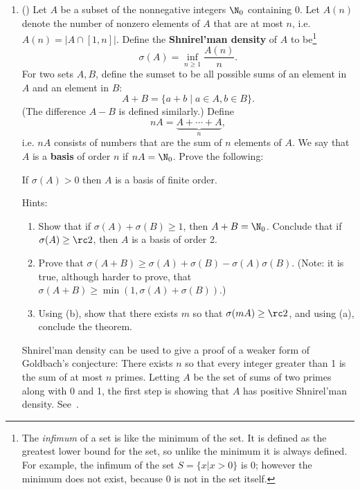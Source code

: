 \begin{enumerate}
\item (\cite[\S 7.4]{Nat}) Let $A$ be a subset of the nonnegative integers $\N_0$ containing 0. Let $A(n)$ denote the number of nonzero elements of $A$ that are at most $n$, i.e. $A(n)=|A\cap [1,n]|$. Define the \textbf{Shnirel'man density} of $A$ to be{\footnote{The {\it infimum} of a set is like the minimum of the set. It is defined as the greatest lower bound for the set, so unlike the minimum it is always defined. For example, the infimum of the set $S=\{x|x>0\}$ is 0; however the minimum does not exist, because 0 is not in the set itself.}}
\[
\sigma(A)=\inf_{n\geq 1} \frac{A(n)}{n}.
\]
For two sets $A,B$, define the sumset to be all possible sums of an element in $A$ and an element in $B$:
\[
A+B=\{a+b\mid a\in A,b\in B\}.
\]
(The difference $A-B$ is defined similarly.) Define
\[
nA=\underbrace{A+\cdots +A}_n,
\]
i.e. $nA$ consists of numbers that are the sum of $n$ elements of $A$. We say that $A$ is a \textbf{basis} of order $n$ if $nA=\N_0$. 
Prove the following:
\begin{thm} 
If $\sigma(A)>0$ then $A$ is a basis of finite order.
\end{thm}
Hints:
\begin{enumerate}
\item
Show that if $\sigma(A)+\sigma(B)\geq 1$, then $A+B=\N_0$. Conclude that if $\sigma(A)\geq \rc 2$, then $A$ is a basis of order 2. 
\item 
Prove that $\sigma(A+B)\geq \sigma(A)+\sigma(B)-\sigma(A)\sigma(B)$. (Note: it is true, although harder to prove, that $\sigma(A+B)\geq \min(1,\sigma(A)+\sigma(B))$.)
\item Using (b), show that there exists $m$ so that $\sigma(mA)\geq \rc 2$, and using (a), conclude the theorem.
\end{enumerate}
Shnirel'man density can be used to give a proof of a weaker form of Goldbach's conjecture: There exists $n$ so that every integer greater than 1 is the sum of at most $n$ primes. Letting $A$ be the set of sums of two primes along with 0 and 1, the first step is showing that $A$ has positive Shnirel'man density. See~\cite[\S 7.5]{Nat}.
\end{enumerate}

